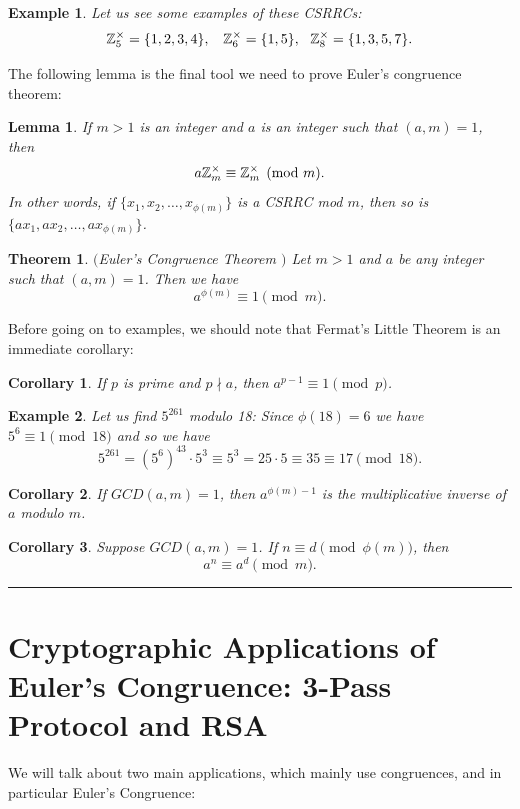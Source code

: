 \documentclass[12pt]{article}
\theoremstyle{plain}
\newtheorem{corollary}{Corollary}
\newtheorem{lemma}{Lemma}
\newtheorem{example}{Example}
\newtheorem{theorem}{Theorem}
\theoremstyle{definition}
\theoremstyle{remark}
\begin{document}
\bigskip
\begin{example}
Let us see some examples of these CSRRCs:
$$\mathbb{Z}_5^{\times} = \{1,2,3,4\}, \:\:\:\:\mathbb{Z}_6^{\times} = \{1,5\}, \:\:\: \mathbb{Z}_8^{\times} = \{1,3,5,7\}.$$
\end{example}

\bigskip
\noindent
The following lemma is the final tool we need to prove Euler's congruence theorem:
\begin{lemma}
If $m>1$ is an integer and $a$ is an integer such that $(a,m)=1$, then
$$a\mathbb{Z}_m^{\times} \equiv \mathbb{Z}_m^{\times} \pmod{m}.$$
In other words, if $\{x_1, x_2, \dots, x_{\phi(m)}\}$ is a CSRRC mod $m$, then so is
$\{ax_1, ax_2, \dots, ax_{\phi(m)}\}$.
\end{lemma}

\bigskip
\noindent
\begin{theorem}$($Euler's Congruence Theorem $)$ \label{EulerCong}
Let $m>1$ and $a$ be any integer such that $(a,m) =1$. Then we have
$$a^{\phi(m)} \equiv 1 \pmod{m}.$$
\end{theorem}

\bigskip
\noindent
Before going on to examples, we should note that Fermat's Little Theorem is an immediate corollary:
\begin{corollary}
If $p$ is prime and $p\nmid a$, then $a^{p-1} \equiv 1\pmod{p}$.
\end{corollary}

\begin{example}
Let us find $5^{261}$ modulo 18: Since $\phi(18)=6$ we have
$5^{6} \equiv 1 \pmod{18}$ and so we have
$$5^{261} = (5^6)^{43} \cdot 5^3 \equiv 5^3 =25\cdot 5 \equiv 35 \equiv 17 \pmod{18}.$$
\end{example}

\bigskip
\noindent
\begin{corollary}
If $GCD(a,m)=1$, then $a^{\phi(m)-1}$ is the multiplicative inverse of $a$ modulo $m$.
\end{corollary}

\begin{corollary}
Suppose $GCD(a,m)=1$. If $n\equiv d \pmod{\phi(m)}$, then
$$a^n \equiv a^d \pmod{m}.$$
\end{corollary}

\bigskip
\hrule

\section{Cryptographic Applications of Euler's Congruence: 3-Pass Protocol and RSA}
We will talk about two main applications, which mainly use congruences, and in particular Euler's Congruence:
\end{document}

